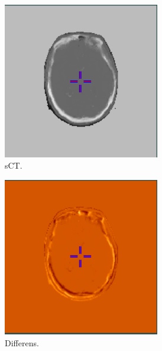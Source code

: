 \begin{figure}
\begin{subfigure}[b]{0.3\textwidth}
        \includegraphics[width=0.75\textwidth]{colager/loocv_ct/loocv_010769_sct.png}
        \caption{sCT.}
        \label{col:loocv_ct_pat2_sct}
    \end{subfigure}\hfill
    \begin{subfigure}[b]{0.3\textwidth}
        \centering
        \includegraphics[width=0.75\textwidth]{colager/loocv_ct/loocv_010769_sub.png}
        \caption{Differens.}
        \label{col:loocv_ct_pat2_sub}
    \end{subfigure}\\
    \begin{subfigure}[b]{0.3\textwidth}
        \centering

\end{subfigure}
\end{figure}

